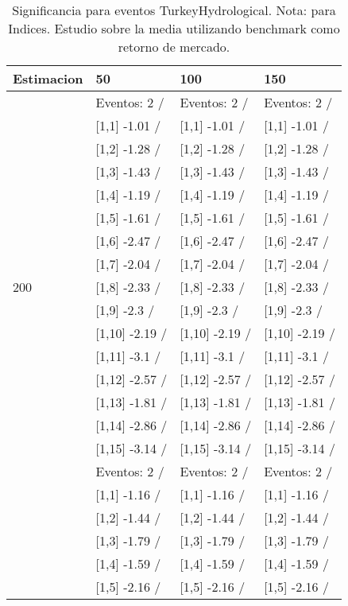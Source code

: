\begin{table}

\caption{Significancia para eventos TurkeyHydrological. Nota: para Indices. Estudio sobre la media utilizando benchmark como retorno de mercado.}
\centering
\begin{tabular}[t]{llll}
\toprule
Estimacion & 50 & 100 & 150\\
\midrule
 & Eventos:  2 / & Eventos:  2 / & Eventos:  2 /\\
 & {}[1,1] -1.01  / & {}[1,1] -1.01  / & {}[1,1] -1.01  /\\
 & {}[1,2] -1.28  / & {}[1,2] -1.28  / & {}[1,2] -1.28  /\\
 & {}[1,3] -1.43  / & {}[1,3] -1.43  / & {}[1,3] -1.43  /\\
 & {}[1,4] -1.19  / & {}[1,4] -1.19  / & {}[1,4] -1.19  /\\
\addlinespace
 & {}[1,5] -1.61  / & {}[1,5] -1.61  / & {}[1,5] -1.61  /\\
 & {}[1,6] -2.47  / & {}[1,6] -2.47  / & {}[1,6] -2.47  /\\
 & {}[1,7] -2.04  / & {}[1,7] -2.04  / & {}[1,7] -2.04  /\\
200 & {}[1,8] -2.33  / & {}[1,8] -2.33  / & {}[1,8] -2.33  /\\
 & {}[1,9] -2.3  / & {}[1,9] -2.3  / & {}[1,9] -2.3  /\\
\addlinespace
 & {}[1,10] -2.19  / & {}[1,10] -2.19  / & {}[1,10] -2.19  /\\
 & {}[1,11] -3.1  / & {}[1,11] -3.1  / & {}[1,11] -3.1  /\\
 & {}[1,12] -2.57  / & {}[1,12] -2.57  / & {}[1,12] -2.57  /\\
 & {}[1,13] -1.81  / & {}[1,13] -1.81  / & {}[1,13] -1.81  /\\
 & {}[1,14] -2.86  / & {}[1,14] -2.86  / & {}[1,14] -2.86  /\\
\addlinespace
 & {}[1,15] -3.14  / & {}[1,15] -3.14  / & {}[1,15] -3.14  /\\
 & Eventos:  2 / & Eventos:  2 / & Eventos:  2 /\\
 & {}[1,1] -1.16  / & {}[1,1] -1.16  / & {}[1,1] -1.16  /\\
 & {}[1,2] -1.44  / & {}[1,2] -1.44  / & {}[1,2] -1.44  /\\
 & {}[1,3] -1.79  / & {}[1,3] -1.79  / & {}[1,3] -1.79  /\\
\addlinespace
 & {}[1,4] -1.59  / & {}[1,4] -1.59  / & {}[1,4] -1.59  /\\
 & {}[1,5] -2.16  / & {}[1,5] -2.16  / & {}[1,5] -2.16  /\\

\end{tabular}
\end{table}
